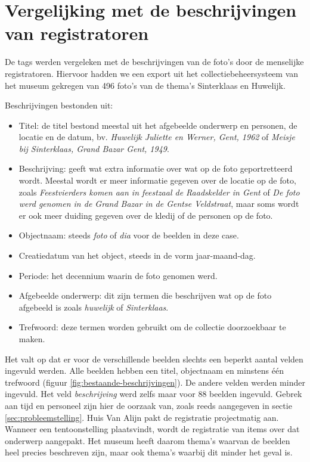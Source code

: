 \section{Vergelijking met de beschrijvingen van registratoren}

De tags werden vergeleken met de beschrijvingen van de foto's door de menselijke registratoren. Hiervoor hadden we een export uit het collectiebeheersysteem van het museum gekregen van 496 foto's van de thema's Sinterklaas en Huwelijk. 

Beschrijvingen bestonden uit:
\begin{itemize}
	\item Titel: de titel bestond meestal uit het afgebeelde onderwerp en personen, de locatie en de datum, bv. \textit{Huwelijk Juliette en Werner, Gent, 1962} of \textit{Meisje bij Sinterklaas, Grand Bazar Gent, 1949}.
	\item Beschrijving: geeft wat extra informatie over wat op de foto geportretteerd wordt.  Meestal wordt er meer informatie gegeven over de locatie op de foto, zoals \textit{Feestvierders komen aan in feestzaal de Raadskelder in Gent} of \textit{De foto werd genomen in de Grand Bazar in de Gentse Veldstraat}, maar soms wordt er ook meer duiding gegeven over de kledij of de personen op de foto.
	\item Objectnaam: steeds \textit{foto} of \textit{dia} voor de beelden in deze case.
	\item Creatiedatum van het object, steeds in de vorm jaar-maand-dag.
	\item Periode: het decennium waarin de foto genomen werd.
	\item Afgebeelde onderwerp: dit zijn termen die beschrijven wat op de foto afgebeeld is zoals \textit{huwelijk} of \textit{Sinterklaas}.
	\item Trefwoord: deze termen worden gebruikt om de collectie doorzoekbaar te maken. 
\end{itemize}

Het valt op dat er voor de verschillende beelden slechts een beperkt aantal velden ingevuld werden. Alle beelden hebben een titel, objectnaam en minstens één trefwoord (figuur \ref{fig:bestaande-beschrijvingen}). De andere velden werden minder ingevuld. Het veld \textit{beschrijving} werd zelfs maar voor 88 beelden ingevuld. Gebrek aan tijd en personeel zijn hier de oorzaak van, zoals reeds aangegeven in sectie \ref{sec:probleemstelling}. Huis Van Alijn pakt de registratie projectmatig aan. Wanneer een tentoonstelling plaatsvindt, wordt de registratie van items over dat onderwerp aangepakt. Het museum heeft daarom thema's waarvan de beelden heel precies beschreven zijn, maar ook thema's waarbij dit minder het geval is. 

